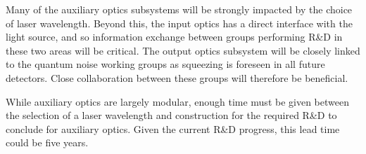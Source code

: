 Many of the auxiliary optics subsystems will be strongly impacted by the choice of laser wavelength. Beyond this, the input optics has a direct interface with the light source, and so information exchange between groups performing R\&D in these two areas will be critical.
The output optics subsystem will be closely linked to the quantum noise working groups as squeezing is foreseen in all future detectors. Close collaboration between these groups will therefore be beneficial.

While auxiliary optics are largely modular, enough time must be given between the selection of a laser wavelength and construction for the required R\&D to conclude for auxiliary optics. Given the current R\&D progress, this lead time could be five years. 
